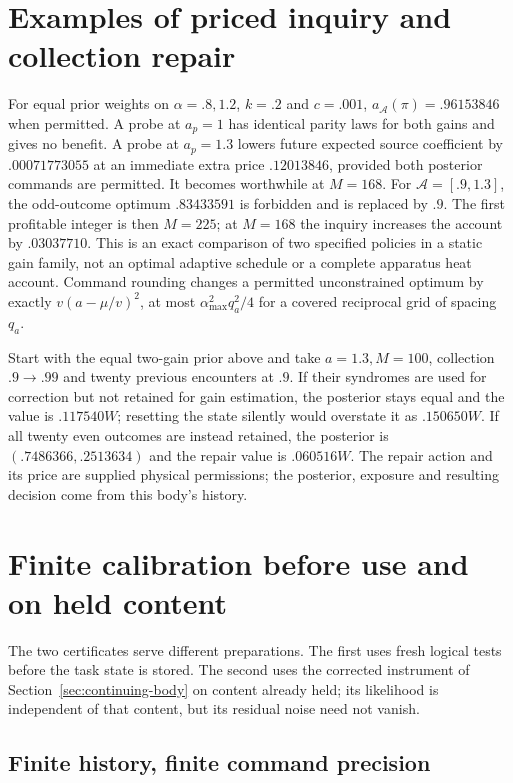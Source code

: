 \documentclass[11pt]{article}
\theoremstyle{definition}
\theoremstyle{remark}
\begin{document}
\section{Examples of priced inquiry and collection repair}
\label{app:inquiry-examples}

For equal prior weights on $\alpha=.8,1.2$, $k=.2$ and $c=.001$,
$a_{\mathcal A}(\pi)=.96153846$ when permitted. A probe at $a_p=1$ has identical parity laws for both
gains and gives no benefit. A probe at $a_p=1.3$ lowers future expected
source coefficient by $.00071773055$ at an immediate extra price
$.12013846$, provided both posterior commands are permitted. It becomes
worthwhile at $M=168$. For $\mathcal A=[.9,1.3]$, the odd-outcome optimum
$.83433591$ is forbidden and is replaced by $.9$. The first profitable
integer is then $M=225$; at $M=168$ the inquiry increases the account by
$.03037710$. This is an
exact comparison of two specified policies in a static gain family, not an
optimal adaptive schedule or a complete apparatus heat account. Command rounding
changes a permitted unconstrained optimum by exactly $v(a-\mu/v)^2$, at most
$\alpha_{\max}^2q_a^2/4$ for a covered reciprocal grid of spacing $q_a$.

Start with the equal
two-gain prior above and take $a=1.3,M=100$, collection $.9\to.99$ and
twenty previous encounters at $.9$. If their syndromes are used for correction
but not retained for gain estimation, the posterior stays equal and the value
is $.117540W$; resetting the state silently would overstate it as $.150650W$.
If all twenty even outcomes are instead retained, the posterior is
$(.7486366,.2513634)$ and the repair value is $.060516W$.
The repair action and its price are supplied
physical permissions; the posterior, exposure and resulting decision come
from this body's history.

\section{Finite calibration before use and on held content}
\label{app:finite-calibration}

The two certificates serve different preparations. The first uses fresh
logical tests before the task state is stored. The second uses the corrected
instrument of Section~\ref{sec:continuing-body} on content already held;
its likelihood is independent of that content, but its residual noise need
not vanish.

\subsection{Finite history, finite command precision}
\end{document}
